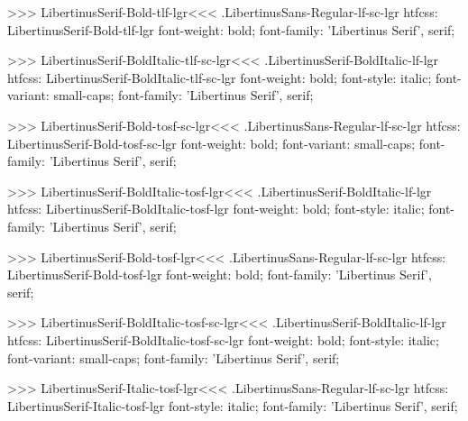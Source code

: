 >>>
\<LibertinusSerif-Bold-tlf-lgr\><<<
.LibertinusSans-Regular-lf-sc-lgr
htfcss:  LibertinusSerif-Bold-tlf-lgr  font-weight: bold; font-family: 'Libertinus Serif', serif;

>>>
\<LibertinusSerif-BoldItalic-tlf-sc-lgr\><<<
.LibertinusSerif-BoldItalic-lf-lgr
htfcss:  LibertinusSerif-BoldItalic-tlf-sc-lgr  font-weight: bold; font-style: italic; font-variant: small-caps; font-family: 'Libertinus Serif', serif;

>>>
\<LibertinusSerif-Bold-tosf-sc-lgr\><<<
.LibertinusSans-Regular-lf-sc-lgr
htfcss:  LibertinusSerif-Bold-tosf-sc-lgr  font-weight: bold; font-variant: small-caps; font-family: 'Libertinus Serif', serif;

>>>
\<LibertinusSerif-BoldItalic-tosf-lgr\><<<
.LibertinusSerif-BoldItalic-lf-lgr
htfcss:  LibertinusSerif-BoldItalic-tosf-lgr  font-weight: bold; font-style: italic; font-family: 'Libertinus Serif', serif;

>>>
\<LibertinusSerif-Bold-tosf-lgr\><<<
.LibertinusSans-Regular-lf-sc-lgr
htfcss:  LibertinusSerif-Bold-tosf-lgr  font-weight: bold; font-family: 'Libertinus Serif', serif;

>>>
\<LibertinusSerif-BoldItalic-tosf-sc-lgr\><<<
.LibertinusSerif-BoldItalic-lf-lgr
htfcss:  LibertinusSerif-BoldItalic-tosf-sc-lgr  font-weight: bold; font-style: italic; font-variant: small-caps; font-family: 'Libertinus Serif', serif;

>>>
\<LibertinusSerif-Italic-tosf-lgr\><<<
.LibertinusSans-Regular-lf-sc-lgr
htfcss:  LibertinusSerif-Italic-tosf-lgr  font-style: italic; font-family: 'Libertinus Serif', serif;


